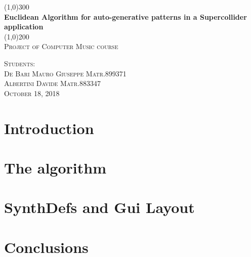 \documentclass[a4paper]{article}
\begin{document}
\begin{titlepage}
	\begin{center}
	\line(1,0){300}\\
	[0.25in]
	\huge{\bfseries Euclidean Algorithm for auto-generative patterns in a Supercollider application}\\
	[2mm]
	\line(1,0){200}\\
	[1.5cm]
	\textsc{\LARGE Project of Computer Music course}\\
	[10.75cm]
	\end{center}
	\begin{flushright}
	\textsc{\large  Students:\\
	De Bari Mauro Giuseppe Matr.899371 \\
	Albertini Davide Matr.883347\\
	October 18, 2018 \\}
	\end{flushright}
\end{titlepage}

\tableofcontents
\newpage

\section{Introduction}


\section{The algorithm}

\section{SynthDefs and Gui Layout}

\section{Conclusions}


\end{document}
